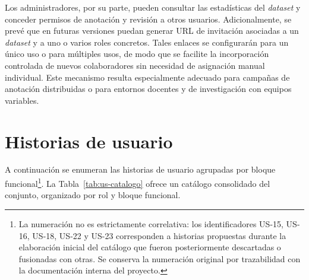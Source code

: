 Los administradores, por su parte, pueden consultar las estadísticas del
\textit{dataset} y conceder permisos de anotación y revisión a otros usuarios.
Adicionalmente, se prevé que en futuras versiones puedan generar URL de
invitación asociadas a un \textit{dataset} y a uno o varios roles concretos.
Tales enlaces se configurarán para un único uso o para múltiples usos, de modo
que se facilite la incorporación controlada de nuevos colaboradores sin
necesidad de asignación manual individual. Este mecanismo resulta especialmente
adecuado para campañas de anotación distribuidas o para entornos docentes y de
investigación con equipos variables.

\section{Historias de usuario}

A continuación se enumeran las historias de usuario agrupadas por bloque
funcional\footnote{La numeración no es estrictamente correlativa: los
	identificadores US-15, US-16, US-18, US-22 y US-23 corresponden a historias
	propuestas durante la elaboración inicial del catálogo que fueron
	posteriormente descartadas o fusionadas con otras. Se conserva la numeración
	original por trazabilidad con la documentación interna del proyecto.}. La
Tabla~\ref{tab:us-catalogo} ofrece un catálogo consolidado del conjunto,
organizado por rol y bloque funcional.

